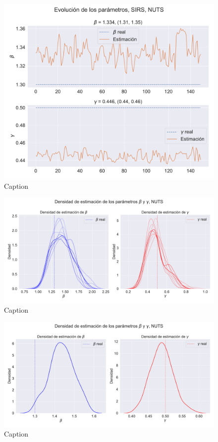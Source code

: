 \begin{figure}[h]
    \centering
    \includegraphics[width=0.8\linewidth]{img/content/chapter4/NUTS_sir_params_trace.pdf}
    \caption{Caption}
    \label{fig:enter-label}
\end{figure}

\begin{figure}[h]
    \centering
    \includegraphics[width=0.8\linewidth]{img/content/chapter4/NUTS_sir_params_density.pdf}
    \caption{Caption}
    \label{fig:enter-label}
\end{figure}

\begin{figure}[h]
    \centering
    \includegraphics[width=0.8\linewidth]{img/content/chapter4/NUTS_sir_params_density_mean.pdf}
    \caption{Caption}
    \label{fig:enter-label}
\end{figure}

